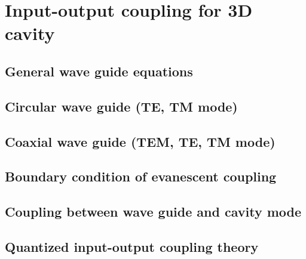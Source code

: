 \chapter{Input-output coupling for 3D cavity}
\section{General wave guide equations}
\section{Circular wave guide (TE, TM mode)}
\section{Coaxial wave guide (TEM, TE, TM mode)}
\section{Boundary condition of evanescent coupling}
\section{Coupling between wave guide and cavity mode}
\section{Quantized input-output coupling theory}